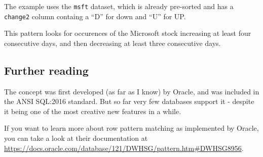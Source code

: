 \documentclass[]{article}
\newenvironment{Shaded}{\begin{snugshade}}{\end{snugshade}}
\newcommand{\CommentTok}[1]{\textcolor[rgb]{0.56,0.35,0.01}{\textit{#1}}}
\newcommand{\KeywordTok}[1]{\textcolor[rgb]{0.13,0.29,0.53}{\textbf{#1}}}
\newcommand{\NormalTok}[1]{#1}
\newcommand{\OperatorTok}[1]{\textcolor[rgb]{0.81,0.36,0.00}{\textbf{#1}}}
\newcommand{\StringTok}[1]{\textcolor[rgb]{0.31,0.60,0.02}{#1}}
\begin{document}
\begin{Shaded}
\end{Shaded}

The example uses the \texttt{msft} dataset, which is already pre-sorted
and has a \texttt{change2} column containg a ``D'' for down and ``U''
for UP.

This pattern looks for occurences of the Microsoft stock increasing at
least four consecutive days, and then decreasing at least three
consecutive days.

\hypertarget{further-reading}{%
\subsection{Further reading}\label{further-reading}}

The concept was first developed (as far as I know) by Oracle, and was
included in the ANSI SQL:2016 standard. But so far very few databases
support it - despite it being one of the most creative new features in a
while.

If you want to learn more about row pattern matching as implemented by
Oracle, you can take a look at their documentation at
\url{https://docs.oracle.com/database/121/DWHSG/pattern.htm\#DWHSG8956}.
\end{document}
